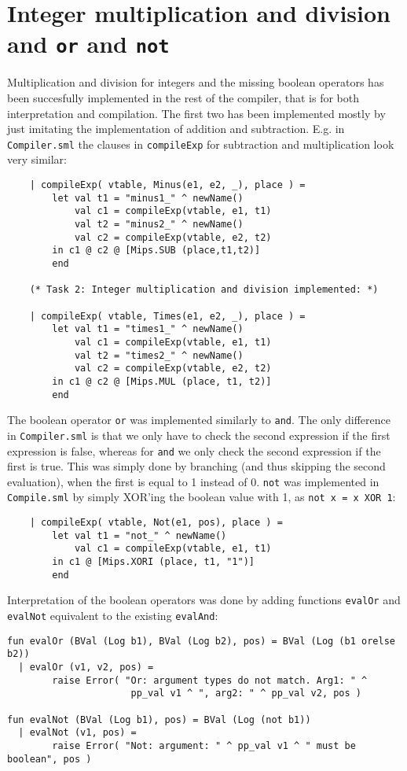 \documentclass{article}
\begin{document}
\section{Integer multiplication and division and \texttt{or} and \texttt{not}}
Multiplication and division for integers and the missing boolean operators has been succesfully implemented in the rest of the compiler, that is for both interpretation and compilation. The first two has been implemented mostly by just imitating the implementation of addition and subtraction. E.g. in \texttt{Compiler.sml} the clauses in \texttt{compileExp} for subtraction and multiplication look very similar:
\begin{verbatim}
    | compileExp( vtable, Minus(e1, e2, _), place ) =
        let val t1 = "minus1_" ^ newName()
            val c1 = compileExp(vtable, e1, t1)
            val t2 = "minus2_" ^ newName()
            val c2 = compileExp(vtable, e2, t2)
        in c1 @ c2 @ [Mips.SUB (place,t1,t2)]
        end

    (* Task 2: Integer multiplication and division implemented: *)

    | compileExp( vtable, Times(e1, e2, _), place ) =
        let val t1 = "times1_" ^ newName()
            val c1 = compileExp(vtable, e1, t1)
            val t2 = "times2_" ^ newName()
            val c2 = compileExp(vtable, e2, t2)
        in c1 @ c2 @ [Mips.MUL (place, t1, t2)]
        end
\end{verbatim}
The boolean operator \texttt{or} was implemented similarly to \texttt{and}. The only difference in \texttt{Compiler.sml} is that we only have to check the second expression if the first expression is false, whereas for \texttt{and} we only check the second expression if the first is true. This was simply done by branching (and thus skipping the second evaluation), when the first is equal to 1 instead of 0.\newline
\texttt{not} was implemented in \texttt{Compile.sml} by simply XOR'ing the boolean value with 1, as \texttt{not x = x XOR 1}:
\begin{verbatim}
    | compileExp( vtable, Not(e1, pos), place ) =
        let val t1 = "not_" ^ newName()
            val c1 = compileExp(vtable, e1, t1)
        in c1 @ [Mips.XORI (place, t1, "1")]
        end
\end{verbatim}
Interpretation of the boolean operators was done by adding functions \texttt{evalOr} and \texttt{evalNot} equivalent to the existing \texttt{evalAnd}:
\begin{verbatim}
fun evalOr (BVal (Log b1), BVal (Log b2), pos) = BVal (Log (b1 orelse b2))
  | evalOr (v1, v2, pos) =
        raise Error( "Or: argument types do not match. Arg1: " ^
                      pp_val v1 ^ ", arg2: " ^ pp_val v2, pos )

fun evalNot (BVal (Log b1), pos) = BVal (Log (not b1))
  | evalNot (v1, pos) =
        raise Error( "Not: argument: " ^ pp_val v1 ^ " must be boolean", pos )
\end{verbatim}
\end{document}
